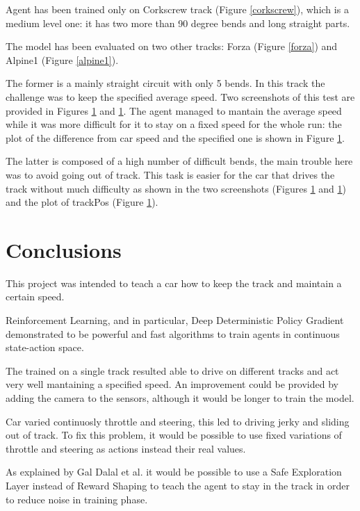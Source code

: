 \documentclass[Lau,oneside,noexaminfo]{sapthesis} %
\begin{document}
Agent has been trained only on Corkscrew track (Figure \ref{corkscrew}), which is a medium level one: it has two more than 90 degree bends and long straight parts.

The model has been evaluated on two other tracks: Forza (Figure \ref{forza}) and Alpine1 (Figure \ref{alpine1}).

The former is a mainly straight circuit with only 5 bends. In this track the challenge was to keep the specified average speed. Two screenshots of this test are provided in Figures \ref{} and \ref{}. The agent managed to mantain the average speed while it was more difficult for it to stay on a fixed speed for the whole run: the plot of the difference from car speed and the specified one is shown in Figure \ref{}.

The latter is composed of a high number of difficult bends, the main trouble here was to avoid going out of track. This task is easier for the car that drives the track without much difficulty as shown in the two screenshots (Figures \ref{} and \ref{}) and the plot of trackPos (Figure \ref{}).

\chapter{Conclusions}
This project was intended to teach a car how to keep the track and maintain a certain speed. 

Reinforcement Learning, and in particular, Deep Deterministic Policy Gradient demonstrated to be powerful and fast algorithms to train agents in continuous state-action space.  

The trained on a single track resulted able to drive on different tracks and act very well mantaining a specified speed. An improvement could be provided by adding the camera to the sensors, although it would be longer to train the model.

Car varied continuosly throttle and steering, this led to driving jerky and sliding out of track. To fix this problem, it would be possible to use fixed variations of throttle and steering as actions instead their real values.

As explained by Gal Dalal et al. \cite{SAFEEXPLORATION} it would be possible to use a Safe Exploration Layer instead of Reward Shaping to teach the agent to stay in the track in order to reduce noise in training phase.



\backmatter

\cleardoublepage
{} %
{}

\end{document}
